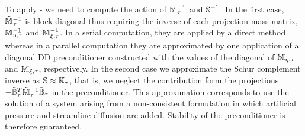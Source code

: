 To apply - we need to compute the action of $\tilde{\mathbb{M}}_\tau^{-1}$ and $\tilde{\mathbb{S}}^{-1}$. In the first case, $\tilde{\mathbb{M}}_\tau^{-1}$ is block diagonal thus requiring the inverse of each projection mass matrix, $\mathbb{M}_{\eta,\tau}^{-1}$ and $\mathbb{M}_{\xi,\tau}^{-1}$. In a serial computation, they are applied by a direct method whereas in a parallel computation they are approximated by one application of a diagonal DD preconditioner constructed with the values of the diagonal of $\mathbb{M}_{\eta,\tau}$ and $\mathbb{M}_{\xi,\tau}$, respectively. In the second case we approximate the Schur complement inverse as $\tilde{\mathbb{S}} \approx \tilde{\mathbb{K}}_\tau$, that is, we neglect the contribution form the projections $-\tilde{\mathbb{B}}_\tau^T\tilde{\mathbb{M}}_\tau^{-1}\tilde{\mathbb{B}}_\tau$  in the preconditioner. This approximation corresponds to use the solution of a system arising from a non-consistent formulation in which artificial pressure and streamline diffusion are added. Stability of the preconditioner is therefore guaranteed.

